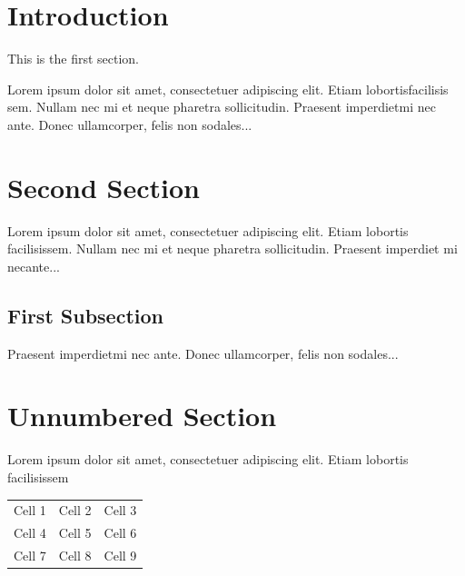 \documentclass[11pt]{article}
\begin{document}
\section{Introduction}

This is the first section.

Lorem  ipsum  dolor  sit  amet,  consectetuer  adipiscing  
elit.   Etiam  lobortisfacilisis sem.  Nullam nec mi et 
neque pharetra sollicitudin.  Praesent imperdietmi nec ante. 
Donec ullamcorper, felis non sodales...

\section{Second Section}

Lorem ipsum dolor sit amet, consectetuer adipiscing elit.  
Etiam lobortis facilisissem.  Nullam nec mi et neque pharetra 
sollicitudin.  Praesent imperdiet mi necante...

\subsection{First Subsection}
Praesent imperdietmi nec ante. Donec ullamcorper, felis non sodales...

\section*{Unnumbered Section}
Lorem ipsum dolor sit amet, consectetuer adipiscing elit.  
Etiam lobortis facilisissem

\begin{center}
\begin{tabular}{ | c | c | c |}
    \hline
    Cell 1 & Cell 2 & Cell 3 \\
    Cell 4 & Cell 5 & Cell 6 \\
    Cell 7 & Cell 8 & Cell 9 \\
    \hline
\end{tabular}  
\end{center}
\end{document}
